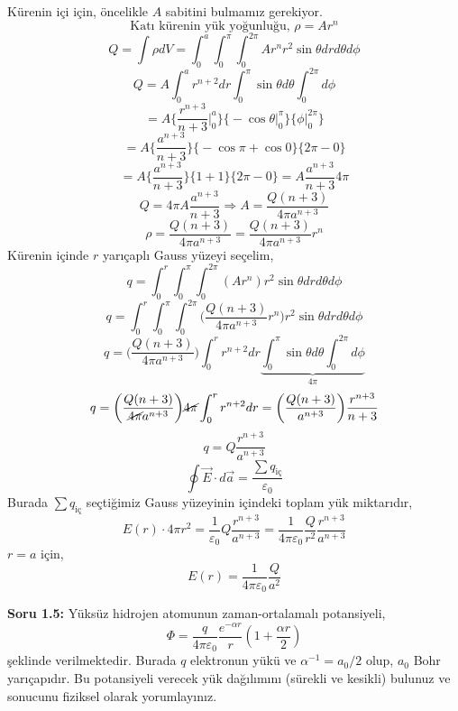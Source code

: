 Kürenin içi için, öncelikle $A$ sabitini bulmamız gerekiyor.
\[ \textrm{Katı kürenin yük yoğunluğu, } \rho = A r^{n} \]
\[ Q = \int \rho dV  = \int_{0}^{a} \int_{0}^{\pi}  \int_{0}^{2 \pi}  A r^{n} r^{2} \sin \theta dr d\theta d \phi \]
\[ Q =  A \int_{0}^{a}  r^{n+2} dr \int_{0}^{\pi} \sin \theta d\theta  \int_{0}^{2 \pi} d \phi \]
\[ =  A  \Bigg\{ \dfrac{r^{n+3}}{n+3} \Bigg|_{0}^{a} \Bigg\} \Bigg\{ - \cos \theta \Bigg|_{0}^{\pi} \Bigg\}  \Bigg\{ \phi \Bigg|_{0}^{2 \pi} \Bigg\} \]
\[ =  A  \Bigg\{ \dfrac{a^{n+3}}{n+3} \Bigg\} \Bigg\{ - \cos \pi + \cos 0 \Bigg\}  \Bigg\{ 2 \pi - 0 \Bigg\} \]
\[ =  A  \Bigg\{ \dfrac{a^{n+3}}{n+3} \Bigg\} \Bigg\{ 1 + 1 \Bigg\}  \Bigg\{ 2 \pi - 0 \Bigg\}  = A  \dfrac{a^{n+3}}{n+3} 4 \pi \]
\[ Q = 4 \pi A \dfrac{a^{n+3}}{n+3} \Rightarrow A = \dfrac{Q (n+3)}{4 \pi a^{n+3}}\]
\[ \rho = \dfrac{Q (n+3)}{4 \pi a^{n+3}} = \dfrac{Q (n+3)}{4 \pi a^{n+3}} r^{n}\]
Kürenin içinde $r$ yarıçaplı Gauss yüzeyi seçelim,
\[ q   = \int_{0}^{r} \int_{0}^{\pi}  \int_{0}^{2 \pi} ( A r^{n} ) r^{2} \sin \theta dr d\theta d \phi \]
\[ q   = \int_{0}^{r} \int_{0}^{\pi}  \int_{0}^{2 \pi} \bigg( \dfrac{Q (n+3)}{4 \pi a^{n+3}} r^{n} \bigg) r^{2} \sin \theta dr d\theta d \phi \]
\[ q   = \bigg( \dfrac{Q (n+3)}{4 \pi a^{n+3}}  \bigg) \int_{0}^{r} r^{n+2} dr \underbrace{\int_{0}^{\pi} \sin \theta d\theta  \int_{0}^{2 \pi} d \phi}_{4 \pi}  \]
\[ q   = \bigg( \dfrac{Q (n+3)}{\cancel{4 \pi} a^{n+3}}  \bigg) \cancel{4 \pi} \int_{0}^{r} r^{n+2} dr  = \bigg( \dfrac{Q (n+3)}{ a^{n+3}}  \bigg) \dfrac{r^{n+3}}{n+3}  \]
\[ q   = Q \dfrac{r^{n+3}}{a^{n+3}} \]
\[ \oint \Vec{E} \cdot d\Vec{a} = \dfrac{\sum q_{\textrm{iç}}}{\varepsilon_{0}}  \]
Burada $\sum q_{\textrm{iç}}$ seçtiğimiz Gauss yüzeyinin içindeki toplam yük miktarıdır,
\[ E (r) \cdot 4 \pi r^{2} = \dfrac{1}{\varepsilon_{0}}  Q \dfrac{r^{n+3}}{a^{n+3}} = \dfrac{1}{4 \pi \varepsilon_{0}}  \dfrac{Q}{r^{2}} \dfrac{r^{n+3}}{a^{n+3}} \]
$r=a$ için, 
\[ E (r) = \dfrac{1}{4 \pi \varepsilon_{0}}  \dfrac{Q}{a^{2}} \]
\begin{flushleft}

   
\textbf{Soru 1.5:} Yüksüz hidrojen atomunun zaman-ortalamalı potansiyeli,
\[ \Phi =\dfrac{q}{4 \pi \varepsilon_{0}}\dfrac{e^{-\alpha r}}{r} (1 + \dfrac{\alpha r}{2})\]
şeklinde verilmektedir. Burada $q$ elektronun yükü ve $\alpha^{-1} = a_{0} / 2$ olup, $a_{0}$ Bohr yarıçapıdır. Bu potansiyeli verecek yük dağılımını (sürekli ve kesikli) bulunuz ve sonucunu fiziksel olarak yorumlayınız.
\end{flushleft}

